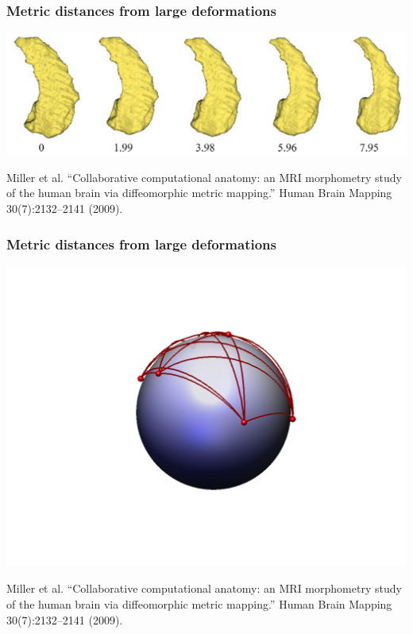 \begin{frame}
\frametitle{Metric distances from large deformations}
\includegraphics[width=\textwidth]{hippocampi}\par
\begin{tiny}
Miller et al. ``Collaborative computational anatomy: an MRI morphometry study of the human brain via diffeomorphic metric mapping.'' Human Brain Mapping 30(7):2132--2141 (2009).\par
\end{tiny}
\end{frame}

\begin{frame}
\frametitle{Metric distances from large deformations}
\includegraphics[width=.8\textwidth]{metric_distances}\par
\begin{tiny}
Miller et al. ``Collaborative computational anatomy: an MRI morphometry study of the human brain via diffeomorphic metric mapping.'' Human Brain Mapping 30(7):2132--2141 (2009).\par
\end{tiny}
\end{frame}


